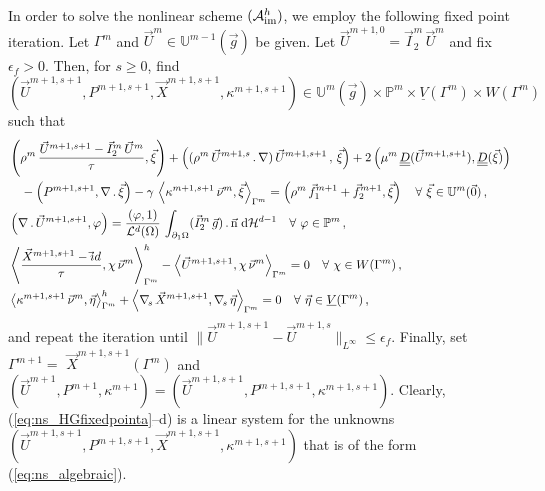 \documentclass[a4paper,12pt,onecolumn]{article}
\newcommand{\vol}{\mathcal{L}^d}
\newcommand{\dH}[1]{\;{\rm d}{\cal H}^{#1}} %
\newcommand{\Vh}{\underline{V}(\Gamma^m)}
\newcommand{\Wh}{W(\Gamma^m)}
\newcommand{\uspacedisc}[2]{\mathbb{U}^{#2}(\vec{#1})}
\newcommand{\pspace}{\mathbb{P}}
\newcommand{\nabs}{\nabla_{\!s}}
\newcommand{\id}{\rm id}
\newcommand{\unitn}{\vec{\rm n}}
\newcommand{\mat}[1]{\underline{\underline{#1}}\rule{0pt}{0pt}}
\newcommand{\schemeAim}{{\mathcal{A}^h_{\rm im}}}
\begin{document}
In order to solve the nonlinear scheme $(\schemeAim)$,
we employ the following fixed point iteration.
Let $\Gamma^m$ and $\vec U^m\in \uspacedisc{g}{m-1}$ be given.
Let $\vec U^{m+1,0}=\vec I^m_2\,\vec U^m$ and fix $\epsilon_f > 0$.
Then, for $s \geq 0$,
find $(\vec U^{m+1,s+1},P^{m+1,s+1}, \vec X^{m+1,s+1}, \kappa^{m+1,s+1}) \in
\uspacedisc{g}{m}\times \pspace^m \times \Vh \times \Wh$ such that
\begin{subequations}
\begin{align}
& \left( \rho^m\,\frac{\vec U^{m+1,s+1} - \vec I^m_2\,\vec U^m}{\tau}, \vec
\xi \right) + \left((\rho^m\,\vec U^{m+1,s}\,.\,\nabla)\,\vec U^{m+1,s+1}\,,
\,\vec \xi \right)
+ 2\left(\mu^m\,\mat D(\vec U^{m+1,s+1}), \mat D(\vec \xi) \right)
\nonumber \\ &\quad
- \left(P^{m+1,s+1}, \nabla\,.\,\vec \xi\right)
- \gamma\,\left\langle \kappa^{m+1,s+1}\,\vec\nu^m,\vec\xi\right\rangle_{\Gamma^m}
= \left(\rho^m\,\vec f_1^{m+1}+\vec f_2^{m+1}, \vec \xi\right)
\quad \forall\ \vec\xi \in \uspacedisc{0}{m}\,, \label{eq:ns_HGfixedpointa} \\
& \left(\nabla\,.\,\vec U^{m+1,s+1}, \varphi\right) =
 \frac{\left(\varphi, 1\right)}{\vol(\Omega)}\, \int_{\partial_1\Omega}
(\vec I^m_2\,\vec g) \,.\, \unitn \dH{d-1}
\quad \forall\ \varphi \in \pspace^m\,,\label{eq:ns_HGfixedpointb} \\
& \left\langle \frac{\vec X^{m+1,s+1} - \vec\id}{\tau} ,\chi\,\vec\nu^m
\right\rangle_{\Gamma^m}^h - \left\langle \vec U^{m+1,s+1}, \chi\,\vec\nu^m
\right\rangle_{\Gamma^m} = 0 \quad \forall\ \chi \in \Wh\,,
\label{eq:ns_HGfixedpointc}\\
& \left\langle \kappa^{m+1,s+1}\,\vec\nu^m, \vec\eta \right\rangle_{\Gamma^m}^h
+ \left\langle \nabs\,\vec X^{m+1,s+1}, \nabs\,\vec \eta
\right\rangle_{\Gamma^m} = 0 \quad \forall\ \vec\eta \in \Vh\,,
\label{eq:ns_HGfixedpointd}
\end{align}
\end{subequations}
and repeat the iteration until $\|\vec U^{m+1,s+1}-\vec U^{m+1,s}\|_{L^\infty}
\leq\epsilon_f$. Finally, set $\Gamma^{m+1}=$ \linebreak
$\vec X^{m+1,s+1}(\Gamma^m)$
and $(\vec U^{m+1}, P^{m+1}, \kappa^{m+1}) = (\vec U^{m+1,s+1}, P^{m+1,s+1},
\kappa^{m+1,s+1})$. Clearly, \mbox{(\ref{eq:ns_HGfixedpointa}--d)} is a linear
system for the unknowns $(\vec U^{m+1,s+1}, P^{m+1,s+1},
\vec X^{m+1,s+1}, \kappa^{m+1,s+1})$ that is of the form
(\ref{eq:ns_algebraic}).
\end{document}
